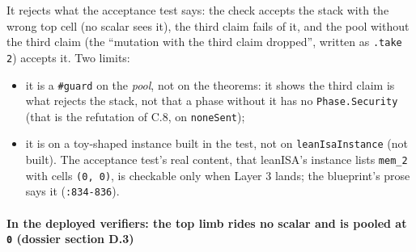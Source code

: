 It rejects what the acceptance test says: the check accepts the stack with the wrong top cell (no scalar sees it), the third claim fails of it, and the pool without the third claim (the \enquote{mutation with the third claim dropped}, written as \texttt{.\allowbreak{}take 2}) accepts it. Two limits:

\begin{itemize}
\item it is a \texttt{\#guard} on the \emph{pool}, not on the theorems: it shows the third claim is what rejects the stack, not that a phase without it has no \texttt{Phase.\allowbreak{}Security} (that is the refutation of C.8, on \texttt{noneSent});
\item it is on a toy-shaped instance built in the test, not on \texttt{leanIsaInstance} (not built). The acceptance test's real content, that leanISA's instance lists \texttt{mem\_\allowbreak{}2} with cells \texttt{(\allowbreak{}0,\allowbreak{} 0)}, is checkable only when Layer 3 lands; the blueprint's prose says it (\texttt{:834-{}836}).
\end{itemize}

\paragraph{In the deployed verifiers: the top limb rides no scalar and is pooled at \texttt{0} (dossier section D.3)}\label{sec:gen-pubinput-D3}

